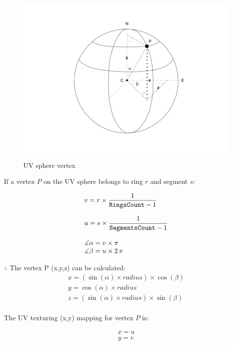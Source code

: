 \begin{figure}[H]
\caption{UV sphere vertex}
\label{fig:uv-sphere-vertex}
\centering
\includegraphics[width=\linewidth]{Figures/uv-sphere-vertex.png}
\decoRule
\end{figure}

If a vertex $P$ on the UV sphere belongs to ring $r$ and segment $s$:

\[
\begin{array}{lr}
v = r \times  \dfrac{1}{\texttt{RingsCount} - 1}\\\\
u = s \times  \dfrac{1}{\texttt{SegmentsCount} - 1}\\\\
\measuredangle \alpha = v \times \pi\\
\measuredangle \beta = u \times 2\,\pi\\
\end{array}
\]

$\therefore$ The vertex P (x,\;y,\;z) can be calculated:
\[
\begin{array}{lr}
x = (\sin(\alpha) \times radius) \times \cos(\beta)\\
y = \cos(\alpha) \times radius\\
z =  (\sin(\alpha) \times radius) \times \sin(\beta)\\
\end{array}
\]

The UV texturing (x,\;y) mapping for vertex $P$ is:

\[
\begin{array}{lr}
x = u\\
y = v\\
\end{array}
\]

